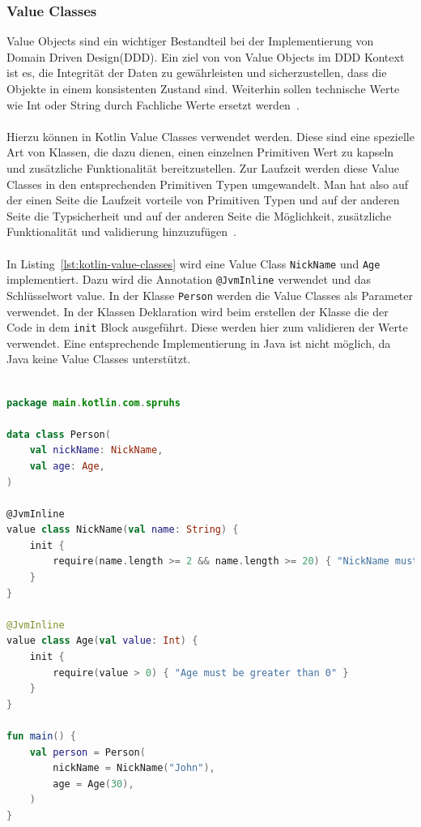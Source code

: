 \documentclass[11pt]{article}
\begin{document}
    \subsubsection{Value Classes}
    Value Objects sind ein wichtiger Bestandteil bei der Implementierung von Domain Driven Design(DDD).
    Ein ziel von von Value Objects im DDD Kontext ist es, die Integrität der Daten zu gewährleisten und sicherzustellen, dass die Objekte in einem konsistenten Zustand sind.
    Weiterhin sollen technische Werte wie Int oder String durch Fachliche Werte ersetzt werden~\cite[219]{red-book}.\\
    \\
    Hierzu können in Kotlin Value Classes verwendet werden.
    Diese sind eine spezielle Art von Klassen, die dazu dienen, einen einzelnen Primitiven Wert zu kapseln und zusätzliche Funktionalität bereitzustellen.
    Zur Laufzeit werden diese Value Classes in den entsprechenden Primitiven Typen umgewandelt.
    Man hat also auf der einen Seite die Laufzeit vorteile von Primitiven Typen und auf der anderen Seite die Typsicherheit und auf der anderen Seite die Möglichkeit, zusätzliche Funktionalität und validierung hinzuzufügen~\cite{kotlin-value-classes}.\\
    \\
    In Listing~\ref{lst:kotlin-value-classes} wird eine Value Class \texttt{NickName} und \texttt{Age} implementiert.
    Dazu wird die Annotation \texttt{@JvmInline} verwendet und das Schlüsselwort value.
    In der Klasse \texttt{Person} werden die Value Classes als Parameter verwendet.
    In der Klassen Deklaration wird beim erstellen der Klasse die der Code in dem \texttt{init} Block ausgeführt.
    Diese werden hier zum validieren der Werte verwendet.
    Eine entsprechende Implementierung in Java ist nicht möglich, da Java keine Value Classes unterstützt.\\
    \\

    \begin{lstlisting}[language=Kotlin, caption={ValueClasses.kt}, label={lst:kotlin-value-classes}]
package main.kotlin.com.spruhs

data class Person(
    val nickName: NickName,
    val age: Age,
)

@JvmInline
value class NickName(val name: String) {
    init {
        require(name.length >= 2 && name.length >= 20) { "NickName must be between 2 and 20 Letters" }
    }
}

@JvmInline
value class Age(val value: Int) {
    init {
        require(value > 0) { "Age must be greater than 0" }
    }
}

fun main() {
    val person = Person(
        nickName = NickName("John"),
        age = Age(30),
    )
}
    \end{lstlisting}
\end{document}
